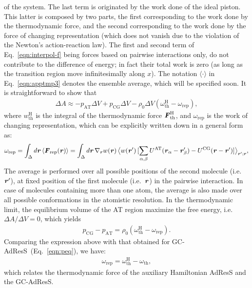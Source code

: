\documentclass[a4paper,preprint,unsortedaddress]{revtex4-1}
\newcommand{\recheck}[1]{{\color{red} #1}}
\newcommand{\vect}[1]{\textbf{\textit{#1}}}
\newcommand{\AT}{{\textrm{{AT}}}}
\newcommand{\CG}{{\textrm{CG}}}
\newcommand{\HY}{{\Delta}}
\newcommand{\thf}{{\textrm{th}}}
\newcommand{\res}{{\textrm{rep}}}
\newcommand{\hadress}{{\textrm{H}}}
\begin{document}
{of the system.
The last term is originated by the work done of the ideal piston. This latter is composed by
two parts, the first corresponding to the work done by the thermodynamic force, and the
second corresponding to 
the work done by the force of changing representation (which does not vanish due to the violation of the Newton's
action-reaction law). The first and second term of Eq.~\eqref{eqn:interpol-f}
being forces based on pairwise interactions only, do not contribute to the difference of energy; in fact 
their total work is zero (as long as the transition region move infinitesimally along $x$).
The notation $\langle\cdot\rangle$ in Eq.~\eqref{eqn:apptmp3} denotes the ensemble average, which
will be specified soon.
It is straightforward to show that
\begin{align}\label{eqn:peq-d}
  \Delta A \approx
  -p_\AT\Delta V + p_\CG\Delta V -
  \rho_0 \Delta V (\omega_\thf^\hadress - \omega_\res), 
\end{align}
where $w_\thf^\hadress$ is the integral of the 
thermodynamic force $\vect F_\thf^\hadress$, and
$ \omega_\res$ is the work of changing representation,
which can be explicitly written down \recheck{in a general form} as:
\begin{align}\label{eqn:w-rep}
  \omega_\res
  = \int_\HY d \vect r\,\langle \vect F_\res (\vect r)\rangle
  = \int_\HY d \vect r\,\nabla_{\vect r}w(\vect r)\,
  \big\langle w(\vect r')\,
  [\sum_{\alpha,\beta}U^\AT(\vect r_\alpha-\vect r'_\beta) - U^\CG(\vect r-\vect r')]\big\rangle_{\vect r'; \vect r},
\end{align}
The average is performed over all
  possible positions of the second molecule (i.e.~$\vect r'$),
  at fixed position of the first molecule (i.e.~$\vect r$) 
  in the pairwise interaction.
In case of molecules containing
more than one atom, the average is also made over all possible
conformations in the atomistic resolution.
In the thermodynamic limit, the equilibrium volume of the AT region maximize the
free energy, i.e.~$\Delta A / \Delta V
= 0$, which yields
\begin{align}\label{eqn:peq-h}
  p_\CG - p_\AT =  \rho_0 (\omega_\thf^\hadress - \omega_\res).
\end{align}
Comparing the expression above with that obtained for GC-AdResS~(Eq.~\eqref{eqn:peq}),
we have: 
\begin{align}\label{eqn:hd-rel}
  \omega_\res = \omega_\thf^\hadress -   \omega_\thf,
\end{align}
which relates the thermodynamic force of the auxiliary Hamiltonian AdResS
and the GC-AdResS.\\

}
\end{document}

